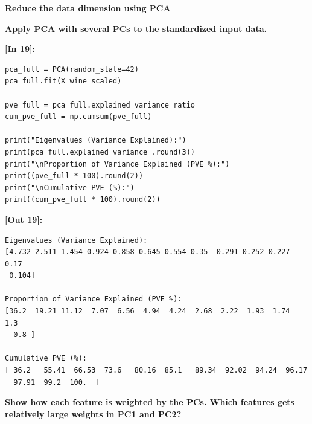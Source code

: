 \vspace{0.3em}
\begin{tcolorbox}[colback=gray!5!white,colframe=gray!50!black,boxrule=0.5pt,arc=2pt,left=4pt,right=4pt,top=2pt,bottom=2pt,unbreakable,before upper={\sloppy\raggedright}]
{\small\bfseries Reduce the data dimension using PCA\par}
\end{tcolorbox}

\vspace{0.3em}
\begin{tcolorbox}[colback=gray!5!white,colframe=gray!50!black,boxrule=0.5pt,arc=2pt,left=4pt,right=4pt,top=2pt,bottom=2pt,unbreakable,before upper={\sloppy\raggedright}]
{\small\bfseries Apply PCA with several PCs to the standardized input data.\par}
\end{tcolorbox}

\vspace{0.4em}
\noindent\textbf{\small [In 19]:}
\begin{lstlisting}[style=pycode]
pca_full = PCA(random_state=42)
pca_full.fit(X_wine_scaled)

pve_full = pca_full.explained_variance_ratio_
cum_pve_full = np.cumsum(pve_full)

print("Eigenvalues (Variance Explained):")
print(pca_full.explained_variance_.round(3))
print("\nProportion of Variance Explained (PVE %):")
print((pve_full * 100).round(2))
print("\nCumulative PVE (%):")
print((cum_pve_full * 100).round(2))
\end{lstlisting}
\noindent\textbf{\small [Out 19]:}
\begin{lstlisting}[style=output]
Eigenvalues (Variance Explained):
[4.732 2.511 1.454 0.924 0.858 0.645 0.554 0.35  0.291 0.252 0.227 0.17
 0.104]

Proportion of Variance Explained (PVE %):
[36.2  19.21 11.12  7.07  6.56  4.94  4.24  2.68  2.22  1.93  1.74  1.3
  0.8 ]

Cumulative PVE (%):
[ 36.2   55.41  66.53  73.6   80.16  85.1   89.34  92.02  94.24  96.17
  97.91  99.2  100.  ]
\end{lstlisting}

\vspace{0.3em}
\begin{tcolorbox}[colback=gray!5!white,colframe=gray!50!black,boxrule=0.5pt,arc=2pt,left=4pt,right=4pt,top=2pt,bottom=2pt,unbreakable,before upper={\sloppy\raggedright}]
{\small\bfseries Show how each feature is weighted by the PCs.  
Which features gets relatively large weights in PC1 and PC2?\par}
\end{tcolorbox}

